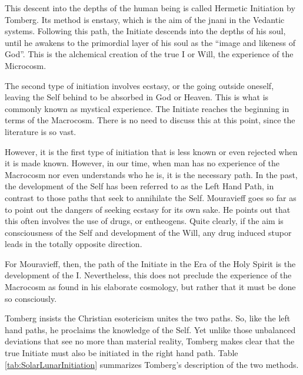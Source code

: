 This descent into the depths of the human being is called Hermetic Initiation by Tomberg. Its method is enstasy, which is the aim of the jnani in the Vedantic systems. Following this path, the Initiate descends into the depths of his soul, until he awakens to the primordial layer of his soul as the ``image and likeness of God''. This is the alchemical creation of the true I or Will, the experience of the Microcosm.

The second type of initiation involves ecstasy, or the going outside oneself, leaving the Self behind to be absorbed in God or Heaven. This is what is commonly known as mystical experience. The Initiate reaches the beginning in terms of the Macrocosm. There is no need to discuss this at this point, since the literature is so vast.

However, it is the first type of initiation that is less known or even rejected when it is made known. However, in our time, when man has no experience of the Macrocosm nor even understands who he is, it is the necessary path. In the past, the development of the Self has been referred to as the Left Hand Path, in contrast to those paths that seek to annihilate the Self. Mouravieff goes so far as to point out the dangers of seeking ecstasy for its own sake. He points out that this often involves the use of drugs, or entheogens. Quite clearly, if the aim is consciousness of the Self and development of the Will, any drug induced stupor leads in the totally opposite direction.

For Mouravieff, then, the path of the Initiate in the Era of the Holy Spirit is the development of the I. Nevertheless, this does not preclude the experience of the Macrocosm as found in his elaborate cosmology, but rather that it must be done so consciously.

Tomberg insists the Christian esotericism unites the two paths. So, like the left hand paths, he proclaims the knowledge of the Self. Yet unlike those unbalanced deviations that see no more than material reality, Tomberg makes clear that the true Initiate must also be initiated in the right hand path. Table \ref{tab:SolarLunarInitiation} summarizes Tomberg's description of the two methods.

